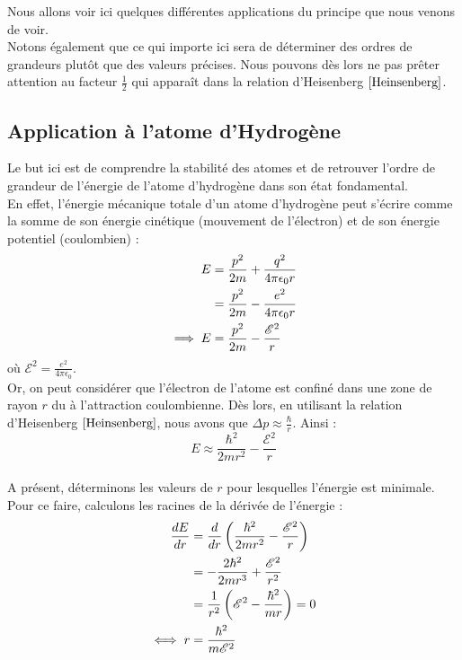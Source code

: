 \documentclass[../Notes de cours]{subfiles}
\begin{document}
Nous allons voir ici quelques différentes applications du principe que nous venons de voir.\\
Notons également que ce qui importe ici sera de déterminer des ordres de grandeurs plutôt que des valeurs précises. Nous pouvons dès lors ne pas prêter attention au facteur $\frac{1}{2}$ qui apparaît dans la relation d'Heisenberg $\ref{Heinsenberg}$.

\subsection{Application à l'atome d'Hydrogène}
Le but ici est de comprendre la stabilité des atomes et de retrouver l'ordre de grandeur de l'énergie de l'atome d'hydrogène dans son état fondamental. \\

En effet, l'énergie mécanique totale d'un atome d'hydrogène peut s'écrire comme la somme de son énergie cinétique (mouvement de l'électron) et de son énergie potentiel (coulombien) : 
\begin{align}
\label{Energie hydrogène}
E &= \frac{p^2}{2m} + \frac{q^2}{4\pi \epsilon_0 r} \notag \\
&= \frac{p^2}{2m} - \frac{e^2}{4 \pi \epsilon_0 r} \notag \\
\implies E &= \frac{p^2}{2m} - \frac{\mathcal{E}^2}{r}
\end{align}
où $\mathcal{E}^2 = \frac{e^2}{4 \pi \epsilon_0}$.\\

Or, on peut considérer que l'électron de l'atome est confiné dans une zone de rayon $r$ du à l'attraction coulombienne. 
Dès lors, en utilisant la relation d'Heisenberg $\ref{Heinsenberg}$, nous avons que $\Delta p \approx \frac{\hbar}{r}$. Ainsi : 
\begin{equation}
\label{Energie hydrogene approx}
E \approx \frac{\hbar^2}{2mr^2} - \frac{\mathcal{E}^2}{r}
\end{equation}
\paragraph{} A présent, déterminons les valeurs de $r$ pour lesquelles l'énergie est minimale. Pour ce faire, calculons les racines de la dérivée de l'énergie :
\begin{align}
\label{rayon d'energie minimale}
\frac{dE}{dr} &= \frac{d}{dr} \left( \frac{\hbar^2}{2mr^2} - \frac{\mathcal{E}^2}{r} \right) \notag \\
&= - \frac{2\hbar^2}{2mr^3} + \frac{\mathcal{E}^2}{r^2} \notag \\
&= \frac{1}{r^2} \left( \mathcal{E}^2 - \frac{\hbar^2}{mr} \right) = 0 \notag \\
\iff r&= \frac{\hbar^2}{m\mathcal{E}^2}
\end{align}
\end{document}
